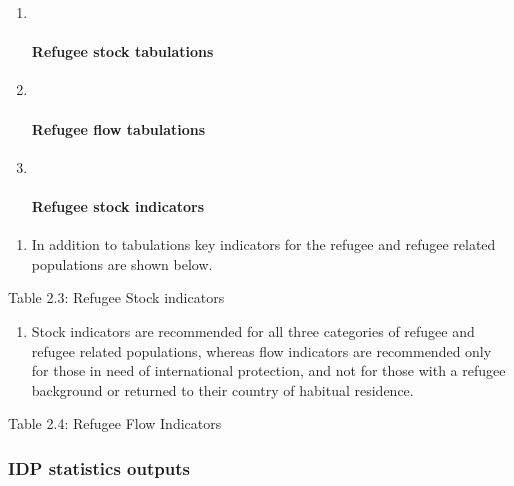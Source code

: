 \documentclass[
]{article}
\providecommand{\tightlist}{%
  \setlength{\itemsep}{0pt}\setlength{\parskip}{0pt}}
\begin{document}
\begin{enumerate}
\def\labelenumi{\arabic{enumi})}
\item ~
  \hypertarget{refugee-stock-tabulations-1}{%
  \paragraph{Refugee stock tabulations}\label{refugee-stock-tabulations-1}}
\item ~
  \hypertarget{refugee-flow-tabulations-1}{%
  \paragraph{Refugee flow tabulations}\label{refugee-flow-tabulations-1}}
\item ~
  \hypertarget{refugee-stock-indicators-1}{%
  \paragraph{Refugee stock indicators}\label{refugee-stock-indicators-1}}
\end{enumerate}

\begin{enumerate}
\def\labelenumi{\arabic{enumi}.}
\setcounter{enumi}{61}
\tightlist
\item
  In addition to tabulations key indicators for the refugee and
  refugee related populations are shown below.
\end{enumerate}

Table 2.3: Refugee Stock indicators

\begin{enumerate}
\def\labelenumi{\arabic{enumi}.}
\setcounter{enumi}{62}
\tightlist
\item
  Stock indicators are recommended for all three categories of refugee
  and refugee related populations, whereas flow indicators are
  recommended only for those in need of international protection, and
  not for those with a refugee background or returned to their country
  of habitual residence.
\end{enumerate}

Table 2.4: Refugee Flow Indicators

\hypertarget{idp-statistics-outputs}{%
\subsubsection{IDP statistics outputs}\label{idp-statistics-outputs}}
\end{document}

